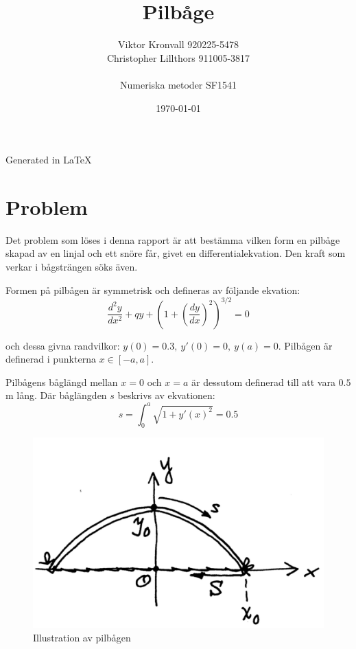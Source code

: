 \documentclass[a4paper,11pt,twoside]{article}
\title{Pilbåge}
\author{
  Viktor Kronvall 920225-5478 \\
  Christopher Lillthors 911005-3817 \\
  \\
  Numeriska metoder SF1541
}
\date{\today}
\begin{document}
\maketitle
\begin{frame}
\null
\vfill
Generated in \LaTeX
\end{frame}
\thispagestyle{empty}
\newpage
\tableofcontents
\thispagestyle{empty}
\newpage
\clearpage
\setcounter{page}{1}
\section{Problem}
Det problem som löses i denna rapport är att bestämma vilken form en pilbåge skapad av en linjal och ett snöre får, givet en differentialekvation. Den kraft som verkar i bågsträngen söks även.

Formen på pilbågen är symmetrisk och defineras av följande ekvation:
\begin{equation} \label{eq:original}
	\dfrac{d^2y}{dx^2} + qy + \left(1+\left(\dfrac{dy}{dx}\right)^2\right)^{3/2} = 0
\end{equation}

och dessa givna randvilkor: $y(0)=0.3,\: y'(0)=0,\: y(a)=0$. Pilbågen är definerad i punkterna $x \in [-a,a]$.

Pilbågens båglängd mellan $x=0$ och $x=a$ är dessutom definerad till att vara $0.5$m lång. Där båglängden $s$ beskrivs av ekvationen:
\begin{equation}
s = \int_0^a{\sqrt{1+y'(x)^2}}=0.5 \nonumber
\end{equation}
\begin{figure}[h!]
\caption{Illustration av pilbågen}
\centering
\includegraphics[scale=0.3]{bild.png}
\end{figure}
\newpage
\end{document}
